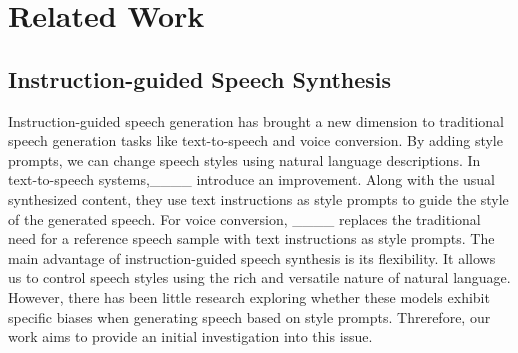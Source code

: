 \section{Related Work}
\subsection{Instruction-guided Speech Synthesis}



Instruction-guided speech generation has brought a new dimension to traditional speech generation tasks like text-to-speech and voice conversion. 
By adding style prompts, we can change speech styles using natural language descriptions.
In text-to-speech systems,____ introduce an improvement. 
Along with the usual synthesized content, they use text instructions as style prompts to guide the style of the generated speech.
For voice conversion, ____ replaces the traditional need for a reference speech sample with text instructions as style prompts.
The main advantage of instruction-guided speech synthesis is its flexibility. 
It allows us to control speech styles using the rich and versatile nature of natural language. 
However, there has been little research exploring whether these models exhibit specific biases when generating speech based on style prompts. 
Threrefore, our work aims to provide an initial investigation into this issue.

